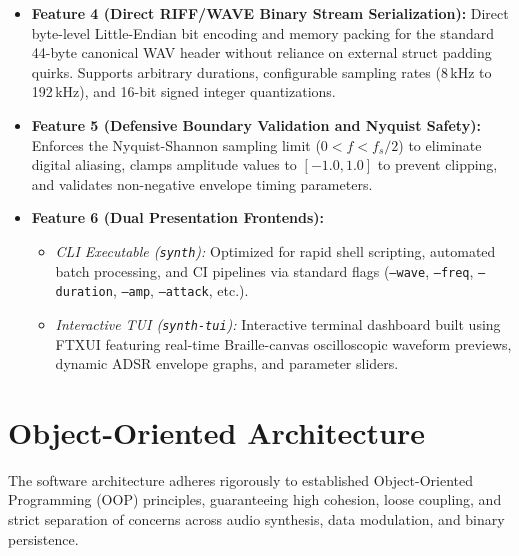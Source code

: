 \documentclass[12pt,a4paper,oneside]{book}
\begin{document}
\begin{itemize}
    \item \textbf{Feature 4 (Direct RIFF/WAVE Binary Stream Serialization):} Direct byte-level Little-Endian bit encoding and memory packing for the standard 44-byte canonical WAV header without reliance on external struct padding quirks. Supports arbitrary durations, configurable sampling rates (8\,kHz to 192\,kHz), and 16-bit signed integer quantizations.

    \item \textbf{Feature 5 (Defensive Boundary Validation and Nyquist Safety):} Enforces the Nyquist-Shannon sampling limit ($0 < f < f_s / 2$) to eliminate digital aliasing, clamps amplitude values to $[-1.0, 1.0]$ to prevent clipping, and validates non-negative envelope timing parameters.

    \item \textbf{Feature 6 (Dual Presentation Frontends):}
    \begin{itemize}
        \item \textit{CLI Executable (\texttt{synth}):} Optimized for rapid shell scripting, automated batch processing, and CI pipelines via standard flags (\texttt{--wave}, \texttt{--freq}, \texttt{--duration}, \texttt{--amp}, \texttt{--attack}, etc.).
        \item \textit{Interactive TUI (\texttt{synth-tui}):} Interactive terminal dashboard built using FTXUI featuring real-time Braille-canvas oscilloscopic waveform previews, dynamic ADSR envelope graphs, and parameter sliders.
    \end{itemize}
\end{itemize}

\section{Object-Oriented Architecture}
The software architecture adheres rigorously to established Object-Oriented Programming (OOP) principles, guaranteeing high cohesion, loose coupling, and strict separation of concerns across audio synthesis, data modulation, and binary persistence.
\end{document}
